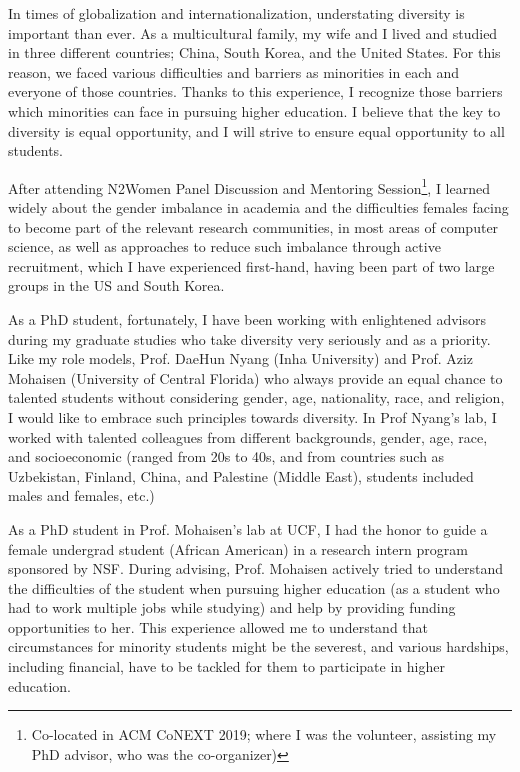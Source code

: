 \documentclass{NSF}
\begin{document}
In times of globalization and internationalization, understating diversity is important than ever.  
As a multicultural family, my wife and I lived and studied in three different countries; China, South Korea, and the United States. For this reason, we faced various difficulties and barriers as minorities in each and everyone of those countries. Thanks to this experience, I recognize those barriers which minorities can face in pursuing higher education. I believe that the key to diversity is equal opportunity, and I will strive to ensure equal opportunity to all students.  

After attending N2Women Panel Discussion and Mentoring Session\footnote{Co-located in ACM CoNEXT 2019; where I was the volunteer, assisting my PhD advisor, who was the co-organizer)}, I learned widely about the gender imbalance in academia and the difficulties females facing to become part of the relevant research communities, in most areas of computer science, as well as approaches to reduce such imbalance through active recruitment, which I have experienced first-hand, having been part of two large groups in the US and South Korea.

As a PhD student, fortunately, I have been working with enlightened advisors during my graduate studies who take diversity very seriously and as a priority. Like my role models, Prof. DaeHun Nyang (Inha University) and Prof. Aziz Mohaisen (University of Central Florida) who always provide an equal chance to talented students without considering gender, age, nationality, race, and religion, I would like to embrace such principles towards diversity. In Prof Nyang's lab, I worked with talented colleagues  from different backgrounds, gender, age, race, and socioeconomic (ranged from 20s to 40s, and from countries such as Uzbekistan, Finland, China, and Palestine (Middle East), students included males and females, etc.) 

As a PhD student in Prof. Mohaisen's lab at UCF, I had the honor to guide a female undergrad student (African American) in a research intern program sponsored by NSF. During advising, Prof. Mohaisen actively tried to understand the difficulties of the student when pursuing higher education (as a student who had to work multiple jobs while studying) and help by providing funding opportunities to her. This experience allowed me to understand that circumstances for minority students might be the severest, and various hardships, including financial, have to be tackled for them to participate in higher education. 
\end{document}
